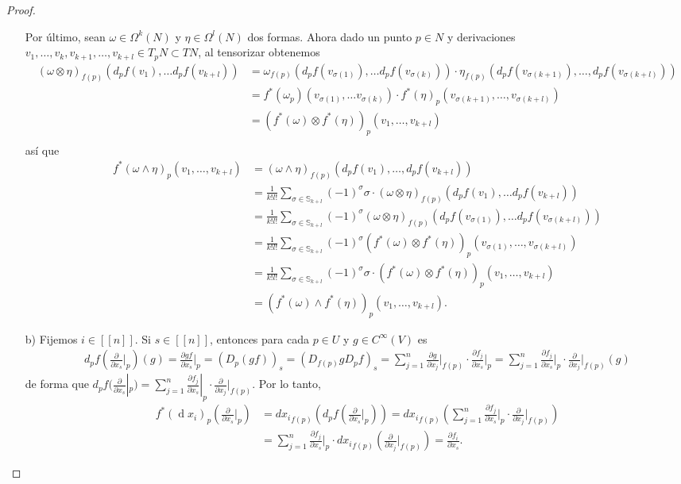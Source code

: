 \documentclass[11pt]{article}
\newcommand{\Ss}{\mathbb{S}}
\newcommand{\nat}[1]{[\![#1]\!]}
\renewcommand{\d}{\operatorname{d}}
\begin{document}
\begin{proof}
\begin{itemize}[listparindent = \parindent]
Por último, sean $\omega \in \Omega^k(N)$ y $\eta \in \Omega^l(N)$ dos formas. Ahora dado un punto $p \in N$ y derivaciones $v_1, \dots, v_k,v_{k+1},\dots,v_{k+l} \in T_pN \subset TN$, al tensorizar obtenemos
\begin{align*}
(\omega \otimes \eta)_{f(p)} (d_pf(v_1), \dots d_pf(v_{k+l})) &= \omega_{f(p)} (d_pf(v_{\sigma(1)}), \dots d_pf(v_{\sigma(k)})) \cdot \eta_{f(p)}(d_pf(v_{\sigma(k+1)}), \dots, d_pf(v_{\sigma(k+l)}))\\
& = f^*(\omega_p) (v_{\sigma(1)}, \dots v_{\sigma(k)}) \cdot f^*(\eta)_p(v_{\sigma(k+1)}, \dots, v_{\sigma(k+l)})\\
& = (f^*(\omega) \otimes f^*(\eta))_p(v_{1},\dots, v_{k+l})\\
\end{align*}
así que 
\begin{align*}
f^*(\omega \wedge \eta)_p(v_1, \dots, v_{k+l}) &= (\omega \wedge \eta)_{f(p)}(d_pf(v_1), \dots, d_pf(v_{k+l}))\\
&= \frac{1}{k!l!}\sum_{\sigma \in \Ss_{k+l}}(-1)^\sigma \sigma \cdot (\omega \otimes \eta)_{f(p)} (d_pf(v_1), \dots d_pf(v_{k+l}))\\
&= \frac{1}{k!l!}\sum_{\sigma \in \Ss_{k+l}}(-1)^\sigma (\omega \otimes \eta)_{f(p)} (d_pf(v_{\sigma(1)}), \dots d_pf(v_{\sigma(k+l)}))\\
&= \frac{1}{k!l!}\sum_{\sigma \in \Ss_{k+l}}(-1)^\sigma (f^*(\omega) \otimes f^*(\eta))_p(v_{\sigma(1)},\dots, v_{\sigma(k+l)})\\
& = \frac{1}{k!l!}\sum_{\sigma \in \Ss_{k+l}}(-1)^\sigma \sigma \cdot (f^*(\omega) \otimes f^*(\eta))_p(v_{1},\dots, v_{k+l})\\
&= (f^*(\omega) \wedge f^*(\eta))_p (v_{1},\dots, v_{k+l}).
\end{align*}
\item[b)] Fijemos $i \in \nat{n}$. Si $s \in \nat{n}$, entonces para cada $p \in U$ y $g \in C^\infty(V)$ es
\begin{align*}
d_pf\left(\frac{\partial}{\partial x_s}\Big|_p\right)(g) = \frac{\partial gf}{\partial x_s}\Big|_p = (D_p(gf))_s = (D_{f(p)}gD_pf)_s = \sum_{j = 1}^n\frac{\partial g}{\partial x_j}\Big|_{f(p)} \cdot \frac{\partial f_j}{\partial x_s}\Big|_p = \sum_{j = 1}^n\frac{\partial f_j}{\partial x_s}\Big|_p\cdot \frac{\partial}{\partial x_j}\Big|_{f(p)}(g)
\end{align*}
de forma que $d_pf(\frac{\partial}{\partial x_s}|_p) = \sum_{j = 1}^n\frac{\partial f_j}{\partial x_s}|_p\cdot \frac{\partial}{\partial x_j}|_{f(p)}$. Por lo tanto,
\begin{align*}
f^*(\d x_i)_p\left(\frac{\partial}{\partial x_s}\Big|_p\right) &= d{x_i}_{f(p)}\left(d_pf\left(\frac{\partial}{\partial x_s}\Big|_p\right)\right) = d{x_i}_{f(p)}\left(\sum_{j = 1}^n\frac{\partial f_j}{\partial x_s}\Big|_p\cdot \frac{\partial}{\partial x_j}\Big|_{f(p)}\right)\\
& = \sum_{j = 1}^n\frac{\partial f_j}{\partial x_s}\Big|_p\cdot d{x_i}_{f(p)}\left(\frac{\partial}{\partial x_j}\Big|_{f(p)}\right) = \frac{\partial f_i}{\partial x_s}.
\end{align*}


\end{itemize}
\end{proof}
\end{document}
